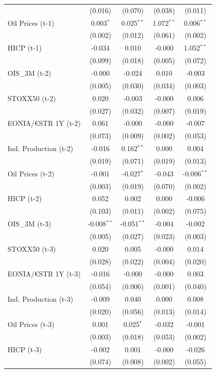 \begin{longtable}[t]{lcccc}
 & (0.016) & (0.070) & (0.038) & (0.011)\\
Oil Prices (t-1) & 0.003$^{*}$ & 0.025$^{**}$ & 1.072$^{**}$ & 0.006$^{**}$\\
 & (0.002) & (0.012) & (0.061) & (0.002)\\
HICP (t-1) & -0.034 & 0.010 & -0.000 & 1.052$^{**}$\\
 & (0.099) & (0.018) & (0.005) & (0.072)\\
OIS\_3M (t-2) & -0.000 & -0.024 & 0.010 & -0.003\\
 & (0.005) & (0.030) & (0.034) & (0.003)\\
STOXX50 (t-2) & 0.020 & -0.003 & -0.000 & 0.006\\
 & (0.027) & (0.032) & (0.007) & (0.019)\\
EONIA/€STR 1Y (t-2) & 0.061 & -0.000 & -0.000 & -0.007\\
 & (0.073) & (0.009) & (0.002) & (0.053)\\
Ind. Production (t-2) & -0.016 & 0.162$^{**}$ & 0.000 & 0.004\\
 & (0.019) & (0.071) & (0.019) & (0.013)\\
Oil Prices (t-2) & -0.001 & -0.027$^{*}$ & -0.043 & -0.006$^{**}$\\
 & (0.003) & (0.019) & (0.070) & (0.002)\\
HICP (t-2) & 0.052 & 0.002 & 0.000 & -0.006\\
 & (0.103) & (0.011) & (0.002) & (0.075)\\
OIS\_3M (t-3) & -0.008$^{**}$ & -0.051$^{**}$ & -0.004 & -0.002\\
 & (0.005) & (0.027) & (0.023) & (0.003)\\
STOXX50 (t-3) & 0.020 & 0.005 & -0.000 & 0.014\\
 & (0.028) & (0.022) & (0.004) & (0.020)\\
EONIA/€STR 1Y (t-3) & -0.016 & -0.000 & -0.000 & 0.003\\
 & (0.054) & (0.006) & (0.001) & (0.040)\\
Ind. Production (t-3) & -0.009 & 0.040 & 0.000 & 0.008\\
 & (0.020) & (0.056) & (0.013) & (0.014)\\
Oil Prices (t-3) & 0.001 & 0.025$^{*}$ & -0.032 & -0.001\\
 & (0.003) & (0.018) & (0.053) & (0.002)\\
HICP (t-3) & -0.002 & 0.001 & -0.000 & -0.026\\
 & (0.074) & (0.008) & (0.002) & (0.055)\\

\end{longtable}
